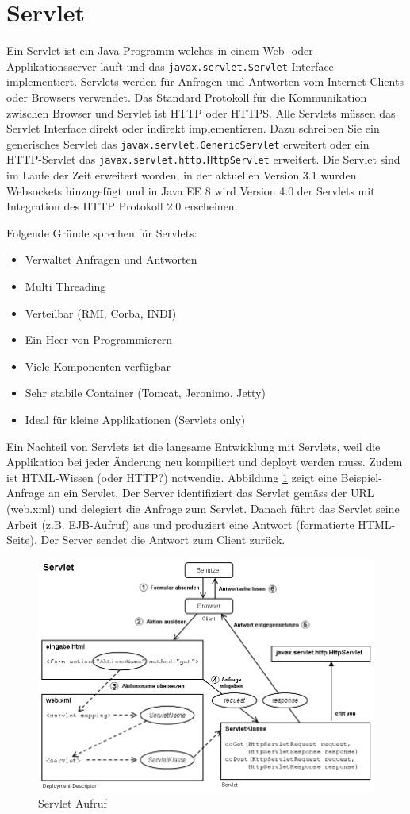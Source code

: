 \section{Servlet}

Ein Servlet ist ein Java Programm welches in einem Web- oder Applikationsserver läuft und das \verb|javax.servlet.Servlet|-Interface implementiert. Servlets werden für Anfragen und Antworten vom Internet Clients oder Browsers verwendet. Das Standard Protokoll für die Kommunikation zwischen Browser und Servlet ist HTTP oder HTTPS. Alle Servlets müssen das Servlet Interface direkt oder indirekt implementieren. Dazu schreiben Sie ein generisches Servlet das
\verb|javax.servlet.GenericServlet| erweitert oder ein HTTP-Servlet das \verb|javax.servlet.http.HttpServlet| erweitert. Die Servlet sind im Laufe der Zeit erweitert worden, in der aktuellen Version 3.1 wurden Websockets hinzugefügt und in Java EE 8 wird Version 4.0 der Servlets mit Integration des HTTP Protokoll 2.0 erscheinen.

Folgende Gründe sprechen für Servlets:

\begin{itemize}
	\item Verwaltet Anfragen und Antworten
	\item Multi Threading
	\item Verteilbar (RMI, Corba, INDI)
	\item Ein Heer von Programmierern
	\item Viele Komponenten verfügbar
	\item Sehr stabile Container (Tomcat, Jeronimo, Jetty)
	\item Ideal für kleine Applikationen (Servlets only)
\end{itemize}

Ein Nachteil von Servlets ist die langsame Entwicklung mit Servlets, weil die Applikation bei jeder Änderung neu kompiliert und deployt werden muss. Zudem ist HTML-Wissen (oder HTTP?) notwendig. Abbildung \ref{fig:servlet-aufruf} zeigt eine Beispiel-Anfrage an ein Servlet. Der Server identifiziert das Servlet gemäss der URL (web.xml) und delegiert die Anfrage zum Servlet. Danach führt das Servlet seine Arbeit (z.B. EJB-Aufruf) aus und produziert eine Antwort (formatierte HTML-Seite). Der Server sendet die Antwort zum Client zurück.

\begin{figure}
\centering
\includegraphics[width=0.7\linewidth]{fig/servlet-aufruf}
\caption{Servlet Aufruf}
\label{fig:servlet-aufruf}
\end{figure}

